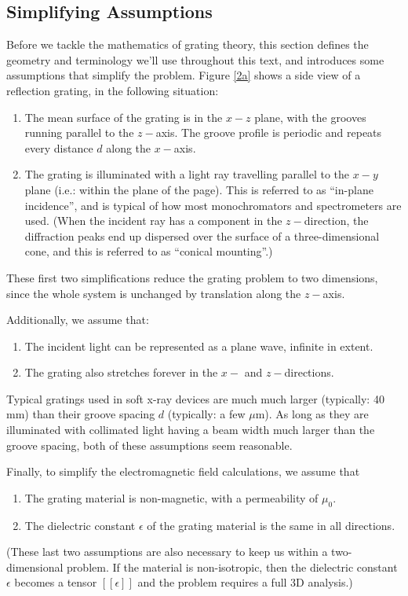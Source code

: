 \subsection{Simplifying Assumptions}
\label{s_assumptions}
Before we tackle the mathematics of grating theory, this section defines the geometry and terminology we'll use throughout this text, and introduces some assumptions that simplify the problem.  Figure \ref{2a} shows a side view of a reflection grating, in the following situation:
\begin{enumerate}
\item The mean surface of the grating is in the $x-z$ plane, with the grooves running parallel to the $z-$axis.  The groove profile is periodic and repeats every distance $d$ along the $x-$axis.
\item The grating is illuminated with a light ray travelling parallel to the $x-y$ plane (i.e.: within the plane of the page). This is referred to as ``in-plane incidence'', and is typical of how most monochromators and spectrometers are used.  (When the incident ray has a component in the $z-$direction, the diffraction peaks end up dispersed over the surface of a three-dimensional cone, and this is referred to as ``conical mounting''.)
\end{enumerate}
These first two simplifications reduce the grating problem to two dimensions, since the whole system is unchanged by translation along the $z-$axis.

Additionally, we assume that:
\begin{enumerate}
\item The incident light can be represented as a plane wave, infinite in extent.  
\item The grating also stretches forever in the $x-$ and $z-$directions.
\end{enumerate}
Typical gratings used in soft x-ray devices are much much larger (typically: 40 mm) than their groove spacing $d$ (typically: a few $\mu$m).  As long as they are illuminated with collimated light having a beam width much larger than the groove spacing, both of these assumptions seem reasonable.

Finally, to simplify the electromagnetic field calculations, we assume that
\begin{enumerate}
\item The grating material is non-magnetic, with a permeability of $\mu_0$.
\item The dielectric constant $\epsilon$ of the grating material is the same in all directions.
\end{enumerate}
(These last two assumptions are also necessary to keep us within a two-dimensional problem.  If the material is non-isotropic, then the dielectric constant $\epsilon$ becomes a tensor $\left[\left[\epsilon\right]\right]$ and the problem requires a full 3D analysis.)

